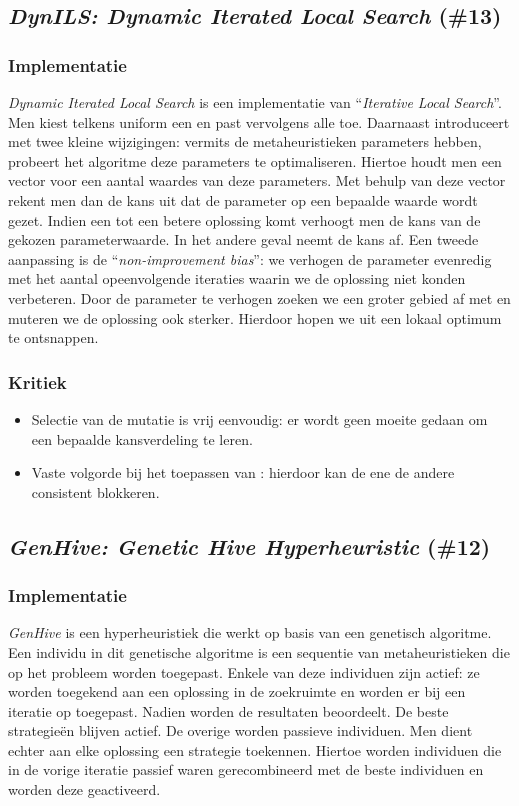 \subsection{\emph{DynILS: Dynamic Iterated Local Search} (\#13)}
\label{sss:dyn-ils}
\subsubsection{Implementatie}
\emph{Dynamic Iterated Local Search}\cite{chesc-dynils,journals/orsnz/ksosils} is een implementatie van ``\emph{Iterative Local Search}''\cite{Lourenco02iteratedlocal}. Men kiest telkens uniform een \abpte{} \abllh{} en past vervolgens alle \abls{} \abhn{} toe. Daarnaast introduceert met twee kleine wijzigingen: vermits de metaheuristieken parameters hebben, probeert het algoritme deze parameters te optimaliseren. Hiertoe houdt men een vector voor een aantal waardes van deze parameters. Met behulp van deze vector rekent men dan de kans uit dat de parameter op een bepaalde waarde wordt gezet. Indien een \abllh{} tot een betere oplossing komt verhoogt men de kans van de gekozen parameterwaarde. In het andere geval neemt de kans af. Een tweede aanpassing is de ``\emph{non-improvement bias}'': we verhogen de parameter evenredig met het aantal opeenvolgende iteraties waarin we de oplossing niet konden verbeteren. Door de parameter te verhogen zoeken we een groter gebied af met \abls{} en muteren we de oplossing ook sterker. Hierdoor hopen we uit een lokaal optimum te ontsnappen.
\subsubsection{Kritiek}
\begin{itemize}
 \item Selectie van de mutatie is vrij eenvoudig: er wordt geen moeite gedaan om een bepaalde kansverdeling te leren.
 \item Vaste volgorde bij het toepassen van \abls{}: hierdoor kan de ene \abls{} \abh{} de andere consistent blokkeren.
\end{itemize}
\subsection{\emph{GenHive: Genetic Hive Hyperheuristic} (\#12)}
\label{sss:genhive}
\subsubsection{Implementatie}
\emph{GenHive}\cite{chesc-genhive} is een hyperheuristiek die werkt op basis van een genetisch algoritme. Een individu in dit genetische algoritme is een sequentie van metaheuristieken die op het probleem worden toegepast. Enkele van deze individuen zijn actief: ze worden toegekend aan een oplossing in de zoekruimte en worden er bij een iteratie op toegepast. Nadien worden de resultaten beoordeelt. De beste strategie\"en blijven actief. De overige worden passieve individuen. Men dient echter aan elke oplossing een strategie toekennen. Hiertoe worden individuen die in de vorige iteratie passief waren gerecombineerd met de beste individuen en worden deze geactiveerd.
